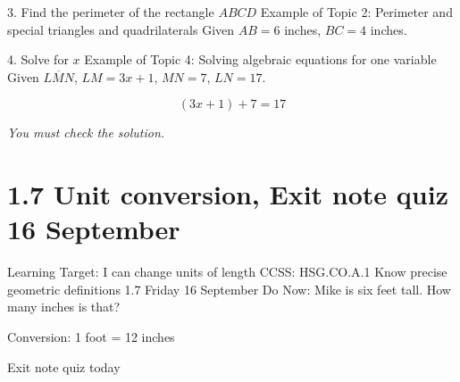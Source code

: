 \begin{frame}{3. Find the perimeter of the rectangle $ABCD$}
  {Example of Topic 2: Perimeter and special triangles and quadrilaterals}
  Given $AB=6$ inches, $BC=4$ inches.
  \begin{center}
  \end{center}
  \end{frame}

\begin{frame}{4. Solve for $x$}
  {Example of Topic 4: Solving algebraic equations for one variable}
  Given $\overline{LMN}$, $LM=3x+1$, $MN=7$, $LN=17$.
    \begin{flushleft}
    \end{flushleft}
  \large \[ (3x+1)+7=17 \] \par \vspace{2cm}
  \emph{You must check the solution.}
  \end{frame}

\section{1.7 Unit conversion, Exit note quiz \hfill 16 September}
\begin{frame}{Learning Target: I can change units of length}
  {CCSS: HSG.CO.A.1 Know precise geometric definitions  \hfill \alert{1.7 Friday 16 September}}
  Do Now: Mike is six feet tall. How many inches is that? \par \medskip
  Conversion: 1 foot = 12 inches \par
  \vspace{3cm}
  \alert{Exit note quiz today}
  \end{frame}

